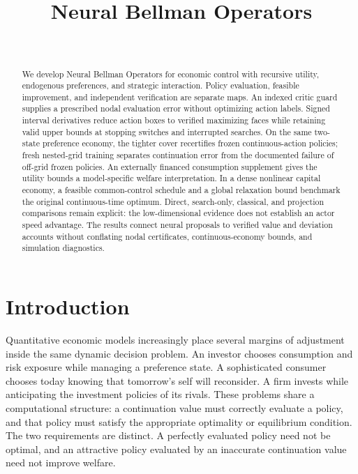 \documentclass[ecta,draft]{econsocart}
\theoremstyle{definition}
\theoremstyle{remark}
\begin{document}
\begin{frontmatter}
\title{Neural Bellman Operators}
\begin{aug}
\author[id=au1,addressref={add1}]{~}
\address[id=add1]{Peking University}
\end{aug}
\begin{abstract}
We develop Neural Bellman Operators for economic control with recursive utility, endogenous preferences, and strategic interaction. Policy evaluation, feasible improvement, and independent verification are separate maps. An indexed critic guard supplies a prescribed nodal evaluation error without optimizing action labels. Signed interval derivatives reduce action boxes to verified maximizing faces while retaining valid upper bounds at stopping switches and interrupted searches. On the same two-state preference economy, the tighter cover recertifies frozen continuous-action policies; fresh nested-grid training separates continuation error from the documented failure of off-grid frozen policies. An externally financed consumption supplement gives the utility bounds a model-specific welfare interpretation. In a dense nonlinear capital economy, a feasible common-control schedule and a global relaxation bound benchmark the original continuous-time optimum. Direct, search-only, classical, and projection comparisons remain explicit: the low-dimensional evidence does not establish an actor speed advantage. The results connect neural proposals to verified value and deviation accounts without conflating nodal certificates, continuous-economy bounds, and simulation diagnostics.
\end{abstract}
\begin{keyword}
\end{keyword}
\end{frontmatter}

\section{Introduction}\label{sec:introduction}
Quantitative economic models increasingly place several margins of adjustment inside the same dynamic decision problem. An investor chooses consumption and risk exposure while managing a preference state. A sophisticated consumer chooses today knowing that tomorrow's self will reconsider. A firm invests while anticipating the investment policies of its rivals. These problems share a computational structure: a continuation value must correctly evaluate a policy, and that policy must satisfy the appropriate optimality or equilibrium condition. The two requirements are distinct. A perfectly evaluated policy need not be optimal, and an attractive policy evaluated by an inaccurate continuation value need not improve welfare.
\end{document}
